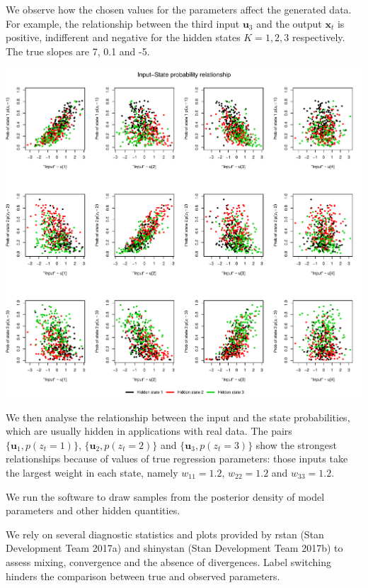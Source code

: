 \documentclass[]{article}
\newcommand{\mat}[1]{\mathbf{#1}}
\begin{document}
We observe how the chosen values for the parameters affect the generated
data. For example, the relationship between the third input
\(\mat{u}_3\) and the output \(\mat{x}_t\) is positive, indifferent and
negative for the hidden states \(K = 1, 2, 3\) respectively. The true
slopes are 7, 0.1 and -5.

\includegraphics[width=\textwidth]{main_pdf_files/figure-latex/iohmm_walkthrough_inputprob-1}

We then analyse the relationship between the input and the state
probabilities, which are usually hidden in applications with real data.
The pairs \(\{ \mat{u}_1, p(z_t = 1) \}\),
\(\{ \mat{u}_2, p(z_t = 2) \}\) and \(\{ \mat{u}_3, p(z_t = 3) \}\) show
the strongest relationships because of values of true regression
parameters: those inputs take the largest weight in each state, namely
\(w_{11} = 1.2\), \(w_{22} = 1.2\) and \(w_{33} = 1.2\).

We run the software to draw samples from the posterior density of model
parameters and other hidden quantities.

We rely on several diagnostic statistics and plots provided by rstan
(Stan Development Team 2017a) and shinystan (Stan Development Team
2017b) to assess mixing, convergence and the absence of divergences.
Label switching hinders the comparison between true and observed
parameters.
\end{document}
